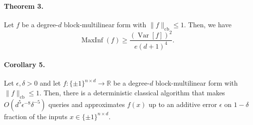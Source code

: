 \paragraph{Theorem 3.}
Let $f$ be a degree-$d$ block-multilinear form with $\|f\|_{\mathrm{cb}}\leq1$. Then, we have
\[\operatorname{MaxInf}(f)\geq\frac{(\operatorname{Var}[f])^2}{e(d+1)^4}.\]
\paragraph{Corollary 5.}
Let $\epsilon,\delta>0$ and let $f:\{\pm1\}^{n\times d}\to\mathbb R$ be a degree-$d$ block-multilinear form with $\|f\|_{\mathrm{cb}}\leq1$. Then, there is a deterministic classical algorithm that makes $O(d^5\epsilon^{-8}\delta^{-5})$ queries and approximates $f(x)$ up to an additive error $\epsilon$ on $1-\delta$ fraction of the inputs $x\in\{\pm1\}^{n\times d}$.
